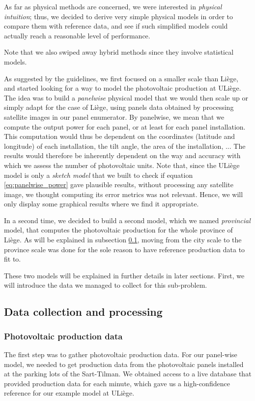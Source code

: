 \documentclass[a4paper, 12pt]{article}
\begin{document}
As far as physical methods are concerned, we were interested in \emph{physical intuition}; thus, we decided to derive very simple physical models in order to compare them with reference data, and see if such simplified models could actually reach a reasonable level of performance.

Note that we also swiped away hybrid methods since they involve statistical models.

As suggested by the guidelines, we first focused on a smaller scale than Liège, and started looking for a way to model the photovoltaic production at ULiège. The idea was to build a \emph{panelwise} physical model that we would then scale up or simply adapt for the case of Liège, using panels data obtained by processing satellite images in our panel enumerator. By panelwise, we mean that we compute the output power for each panel, or at least for each panel installation. This computation would thus be dependent on the coordinates (latitude and longitude) of each installation, the tilt angle, the area of the installation, ... The results would therefore be inherently dependent on the way and accuracy with which we assess the number of photovoltaic units. Note that, since the ULiège model is only a \emph{sketch model} that we built to check if equation \ref{eq:panelwise_power} gave plausible results, without processing any satellite image, we thought computing its error metrics was not relevant. Hence, we will only display some graphical results where we find it appropriate. 

In a second time, we decided to build a second model, which we named \emph{provincial} model, that computes the photovoltaic production for the whole province of Liège. As will be explained in subsection \ref{subsec:pv_power_data}, moving from the city scale to the province scale was done for the sole reason to have reference production data to fit to.

These two models will be explained in further details in later sections. First, we will introduce the data we managed to collect for this sub-problem.

\subsection{Data collection and processing}
\label{subsec:pv_power_data}

\subsubsection{Photovoltaic production data}
The first step was to gather photovoltaic production data. For our panel-wise model, we needed to get production data from the photovoltaic panels installed at the parking lots of the Sart-Tilman. We obtained access to a live database that provided production data for each minute, which gave us a high-confidence reference for our example model at ULiège.
\end{document}
